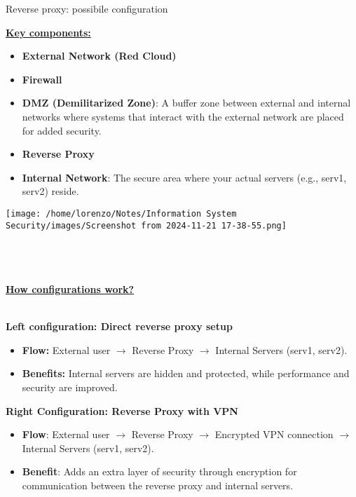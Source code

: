 \begin{quotebox}[colframe=blue!10!white, colback=blue!5!white]{Reverse proxy: possibile configuration}
\begin{minipage}{0.5\textwidth}
    \underline{\textbf{Key components:}}
    \begin{itemize}
        \item \textbf{External Network (Red Cloud)}
        \item \textbf{Firewall}
        \item \textbf{DMZ (Demilitarized Zone)}: A buffer zone between external and internal networks where systems that interact with the external network are placed for added security.
        \item \textbf{Reverse Proxy}
        \item \textbf{Internal Network}: The secure area where your actual servers (e.g., serv1, serv2) reside.
    \end{itemize}    
\end{minipage} 
\hspace{0.5cm}
\begin{minipage}{0.45\textwidth}
    \centering
    \texttt{[image: /home/lorenzo/Notes/Information System Security/images/Screenshot from 2024-11-21 17-38-55.png]}
\end{minipage}
\\
\\\\
\underline{\textbf{How configurations work?}}
\\\\
\begin{minipage}[t]{0.45\textwidth}
   \textbf{Left configuration: Direct reverse proxy setup}
   \begin{itemize}
    \item \textbf{Flow:} External user \(\rightarrow\) Reverse Proxy \(\rightarrow\) Internal Servers (serv1, serv2).  
    \item \textbf{Benefits:} Internal servers are hidden and protected, while performance and security are improved.
   \end{itemize}
\end{minipage} 
\hspace{1cm}
\begin{minipage}[t]{0.45\textwidth}
   \textbf{Right Configuration: Reverse Proxy with VPN}
   \begin{itemize}
    \item \textbf{Flow}: External user \(\rightarrow\) Reverse Proxy \(\rightarrow\) Encrypted VPN connection \(\rightarrow\) Internal Servers (serv1, serv2).
    \item \textbf{Benefit}: Adds an extra layer of security through encryption for communication between the reverse proxy and internal servers.
   \end{itemize}
\end{minipage}
\end{quotebox}

